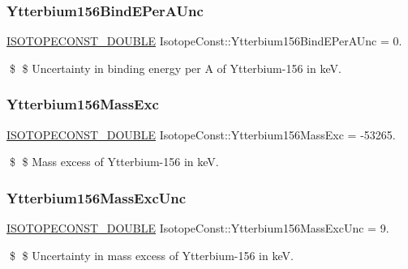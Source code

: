 \subsubsection{\texorpdfstring{Ytterbium156\+Bind\+E\+Per\+A\+Unc}{Ytterbium156BindEPerAUnc}}
{\footnotesize\ttfamily \mbox{\hyperlink{group___isotope_const-_macros_ga8f45a7272ce02c0b4c65c44636ed719a}{I\+S\+O\+T\+O\+P\+E\+C\+O\+N\+S\+T\+\_\+\+D\+O\+U\+B\+LE}} Isotope\+Const\+::\+Ytterbium156\+Bind\+E\+Per\+A\+Unc = 0.}

\$ \$ Uncertainty in binding energy per A of Ytterbium-\/156 in keV. \mbox{\label{group___isotope_const-_ytterbium-_yb156_ga3dbf7570390d3994ac74730017c6c67b}} 
\subsubsection{\texorpdfstring{Ytterbium156\+Mass\+Exc}{Ytterbium156MassExc}}
{\footnotesize\ttfamily \mbox{\hyperlink{group___isotope_const-_macros_ga8f45a7272ce02c0b4c65c44636ed719a}{I\+S\+O\+T\+O\+P\+E\+C\+O\+N\+S\+T\+\_\+\+D\+O\+U\+B\+LE}} Isotope\+Const\+::\+Ytterbium156\+Mass\+Exc = -\/53265.}

\$ \$ Mass excess of Ytterbium-\/156 in keV. \mbox{\label{group___isotope_const-_ytterbium-_yb156_ga1564590433f7a0a8cbb72b38b34f08f4}} 
\subsubsection{\texorpdfstring{Ytterbium156\+Mass\+Exc\+Unc}{Ytterbium156MassExcUnc}}
{\footnotesize\ttfamily \mbox{\hyperlink{group___isotope_const-_macros_ga8f45a7272ce02c0b4c65c44636ed719a}{I\+S\+O\+T\+O\+P\+E\+C\+O\+N\+S\+T\+\_\+\+D\+O\+U\+B\+LE}} Isotope\+Const\+::\+Ytterbium156\+Mass\+Exc\+Unc = 9.}

\$ \$ Uncertainty in mass excess of Ytterbium-\/156 in keV. \mbox{\label{group___isotope_const-_ytterbium-_yb156_ga75a49ca2da07bfcb8da4c2cb572d5d21}} 
